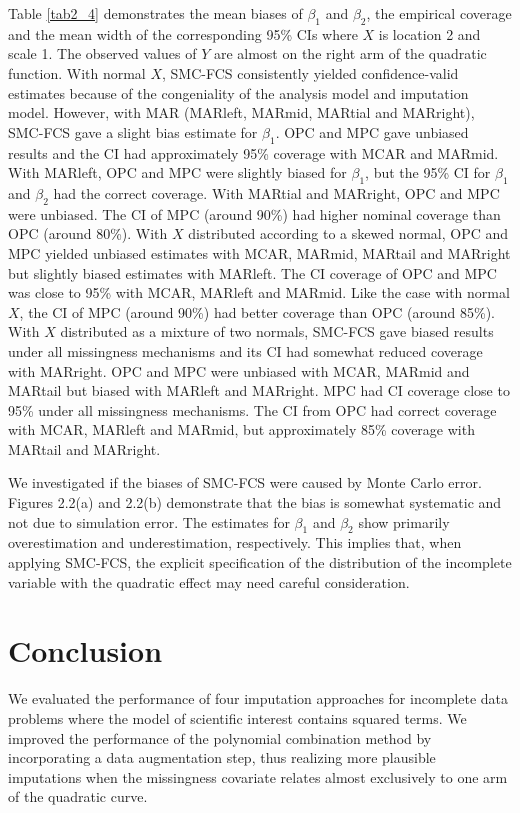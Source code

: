 	Table \ref{tab2_4} demonstrates the mean biases of $\beta_{1}$ and $\beta_{2}$, the empirical coverage and the mean width of the corresponding 95\% CIs where $X$ is location 2 and scale 1. The observed values of $Y$ are almost on the right arm of the quadratic function. With normal $X$, SMC-FCS consistently yielded confidence-valid estimates because of the congeniality of the analysis model and imputation model. However, with MAR (MARleft, MARmid, MARtial and MARright), SMC-FCS gave a slight bias estimate for $\beta_{1}$. OPC and MPC gave unbiased results and the CI had approximately 95\% coverage with MCAR and MARmid. With MARleft, OPC and MPC were slightly biased for $\beta_{1}$, but the 95\% CI for $\beta_{1}$ and $\beta_{2}$ had the correct coverage. With MARtial and MARright, OPC and MPC were unbiased. The CI of MPC (around 90\%) had higher nominal coverage than OPC (around 80\%). With $X$ distributed according to a skewed normal, OPC and MPC yielded unbiased estimates with MCAR, MARmid, MARtail and MARright but slightly biased estimates with MARleft. The CI coverage of OPC and MPC was close to 95\% with MCAR, MARleft and MARmid. Like the case with normal $X$, the CI of MPC (around 90\%) had better coverage than OPC (around 85\%). With $X$ distributed as a mixture of two normals, SMC-FCS gave biased results under all missingness mechanisms and its CI had somewhat reduced coverage with MARright. OPC and MPC were unbiased with MCAR, MARmid and MARtail but biased with MARleft and MARright. MPC had CI coverage close to 95\% under all missingness mechanisms. The CI from OPC had correct coverage with MCAR, MARleft and MARmid, but approximately 85\% coverage with MARtail and MARright.         
	
	
	We investigated if the biases of SMC-FCS were caused by Monte Carlo error. Figures 2.2(a) and 2.2(b) demonstrate that the bias is somewhat systematic and not due to simulation error. The estimates for $\beta_{1}$ and $\beta_{2}$ show primarily overestimation and underestimation, respectively. This implies that, when applying SMC-FCS, the explicit specification of the distribution of the incomplete variable with the quadratic effect may need careful consideration.
	
	\section{Conclusion}
	We evaluated the performance of four imputation approaches for incomplete data problems where the model of scientific interest contains squared terms. We improved the performance of the polynomial combination method by incorporating a data augmentation step, thus realizing more plausible imputations when the missingness covariate relates almost exclusively to one arm of the quadratic curve.
	
